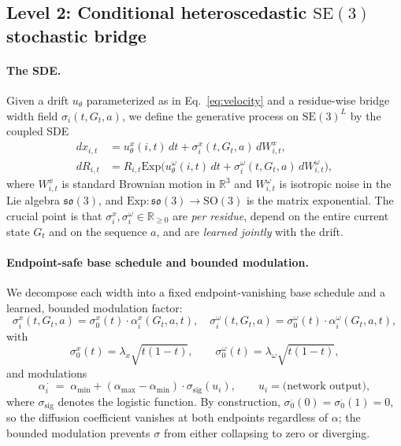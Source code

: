 \documentclass{article}
\theoremstyle{remark}
\theoremstyle{definition}
\newcommand{\R}{\mathbb{R}}
\newcommand{\SO}{\mathrm{SO}}
\newcommand{\SE}{\mathrm{SE}}
\newcommand{\so}{\mathfrak{so}}
\newcommand{\Exp}{\mathrm{Exp}}
\newcommand{\sigmoid}{\sigma_{\mathrm{sig}}}
\begin{document}
\subsection{Level 2: Conditional heteroscedastic $\SE(3)$ stochastic bridge}
\label{subsec:bridge}

\paragraph{The SDE.}
Given a drift $u_\theta$ parameterized as in Eq.~\eqref{eq:velocity} and a
residue-wise bridge width field $\sigma_i(t,G_t,a)$, we define the generative
process on $\SE(3)^L$ by the coupled SDE
\begin{align}
dx_{i,t} &= u^x_\theta(i,t)\,dt+\sigma^x_i(t,G_t,a)\,dW^x_{i,t},
\label{eq:sde-trans}\\
dR_{i,t} &= R_{i,t}\Exp\!\Big(u^\omega_\theta(i,t)\,dt
   +\sigma^\omega_i(t,G_t,a)\,dW^\omega_{i,t}\Big),
\label{eq:sde-rots}
\end{align}
where $W^x_{i,t}$ is standard Brownian motion in $\R^3$ and $W^\omega_{i,t}$ is
isotropic noise in the Lie algebra $\so(3)$, and $\Exp:\so(3)\to\SO(3)$ is the
matrix exponential. The crucial point is that
$\sigma^x_i,\sigma^\omega_i\in\R_{\geq 0}$ are \emph{per residue}, depend on the
entire current state $G_t$ and on the sequence $a$, and are \emph{learned
jointly} with the drift.

\paragraph{Endpoint-safe base schedule and bounded modulation.}
We decompose each width into a fixed endpoint-vanishing base schedule and a
learned, bounded modulation factor:
\begin{equation}
\sigma^x_i(t,G_t,a)=\sigma^x_0(t)\cdot\alpha^x_i(G_t,a,t),\quad
\sigma^\omega_i(t,G_t,a)=\sigma^\omega_0(t)\cdot\alpha^\omega_i(G_t,a,t),
\label{eq:sigma-decomp}
\end{equation}
with
\begin{equation}
\sigma^x_0(t)=\lambda_x\sqrt{t(1-t)},\qquad
\sigma^\omega_0(t)=\lambda_\omega\sqrt{t(1-t)},
\label{eq:base-schedule}
\end{equation}
and modulations
\begin{equation}
\alpha^{\,\cdot}_i\;=\;\alpha_{\min}+(\alpha_{\max}-\alpha_{\min})\cdot\sigmoid(u_i),
\qquad u_i=\text{(network output)},
\label{eq:alpha-bounded}
\end{equation}
where $\sigmoid$ denotes the logistic function. By construction,
$\sigma^{\cdot}_0(0)=\sigma^{\cdot}_0(1)=0$, so the diffusion coefficient
vanishes at both endpoints regardless of $\alpha$; the bounded modulation
prevents $\sigma$ from either collapsing to zero or diverging.
\end{document}
